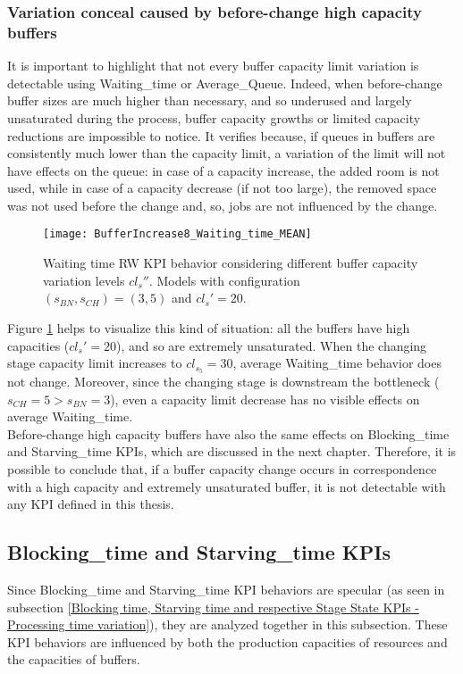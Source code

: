 \subsubsection{Variation conceal caused by before-change high capacity buffers}
It is important to highlight that not every buffer capacity limit variation is detectable using Waiting\_time or Average\_Queue. Indeed, when before-change buffer sizes are much higher than necessary, and so underused and largely unsaturated during the process, buffer capacity growths or limited capacity reductions are impossible to notice. It verifies because, if queues in buffers are consistently much lower than the capacity limit, a variation of the limit will not have effects on the queue: in case of a capacity increase, the added room is not used, while in case of a capacity decrease (if not too large), the removed space was not used before the change and, so, jobs are not influenced by the change.
\begin{figure}[h]
\centering
\texttt{[image: BufferIncrease8\_Waiting\_time\_MEAN]}
\caption[Waiting time RW KPI behavior with different buffer capacity variation levels and high before-change buffer capacity limits]{Waiting time RW KPI behavior considering different buffer capacity variation levels $cl_s''$. Models with configuration $(s_{BN},s_{CH})=(3,5)$ and $cl_s'=20$.}
\label{fig:Waiting time RW KPI behavior with different buffer capacity variation levels and high before-change buffer capacity limits}
\end{figure}
Figure \ref{fig:Waiting time RW KPI behavior with different buffer capacity variation levels and high before-change buffer capacity limits} helps to visualize this kind of situation: all the buffers have high capacities ($cl_s'=20$), and so are extremely unsaturated. When the changing stage capacity limit increases to $cl_{s_{5}}=30$, average Waiting\_time behavior does not change. Moreover, since the changing stage is downstream the bottleneck ($s_{CH}=5>s_{BN}=3$), even a capacity limit decrease has no visible effects on average Waiting\_time.\\
Before-change high capacity buffers have also the same effects on Blocking\_time and Starving\_time KPIs, which are discussed in the next chapter. Therefore, it is possible to conclude that, if a buffer capacity change occurs in correspondence with a high capacity and extremely unsaturated buffer, it is not detectable with any KPI defined in this thesis. 
\newpage
\subsection{Blocking\_time and Starving\_time KPIs}
\label{Blocking time and Starving time KPIs - Buffer capacity variation}
Since Blocking\_time and Starving\_time KPI behaviors are specular (as seen in subsection \ref{Blocking time, Starving time and respective Stage State KPIs - Processing time variation}), they are analyzed together in this subsection. These KPI behaviors are influenced by both the production capacities of resources and the capacities of buffers. 
